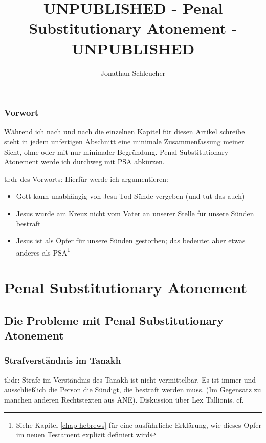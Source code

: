 \documentclass[12pt]{report}
\title{UNPUBLISHED - Penal Substitutionary Atonement - UNPUBLISHED}
\date{}
\author{Jonathan Schleucher}
\begin{document}
{\let\newpage\relax\maketitle}


\tableofcontents

\section*{Vorwort}
Während ich nach und nach die einzelnen Kapitel für diesen Artikel schreibe steht in jedem unfertigen Abschnitt eine minimale Zusammenfassung
meiner Sicht, ohne oder mit nur minimaler Begründung.
Penal Substitutionary Atonement werde ich durchweg mit PSA abkürzen.

tl;dr des Vorworts:
Hierfür werde ich argumentieren:
\begin{itemize}
\item Gott kann unabhängig von Jesu Tod Sünde vergeben (und tut das auch)
\item Jesus wurde am Kreuz nicht vom Vater an unserer Stelle für unsere Sünden bestraft
\item Jesus ist als Opfer für unsere Sünden gestorben; das bedeutet aber etwas anderes als PSA\footnote{
	Siehe Kapitel \ref{chap-hebrews} für eine ausführliche Erklärung, wie dieses Opfer im neuen Testament explizit definiert wird}
\end{itemize}

\pagebreak


\pagebreak


\pagebreak
\part{\label{psa-definition}Penal Substitutionary Atonement}


\chapter{Die Probleme mit Penal Substitutionary Atonement}
\section{Strafverständnis im Tanakh}
tl;dr:
Strafe im Verständnis des Tanakh ist nicht vermittelbar. Es ist immer und ausschließlich die Person die Sündigt, die bestraft werden muss. (Im Gegensatz zu manchen anderen Rechtstexten aus ANE).
Diskussion über Lex Tallionis.
cf. \Cite{old-testament-justice}
\end{document}
